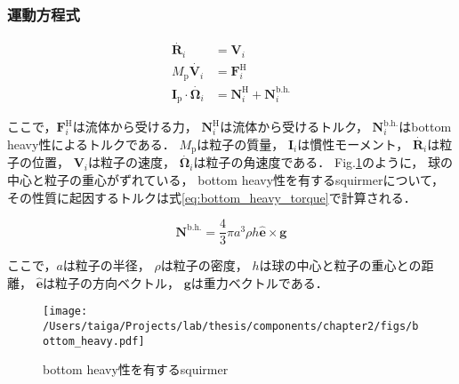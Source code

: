 \subsubsection{運動方程式}
\label{sec:equation_of_motion}
    \begin{align}
        \dot{\boldsymbol{R}_i} &= \boldsymbol{V}_i \\
        M_\mathrm{p} \dot{\boldsymbol{V}_i} &= \boldsymbol{F}^\mathrm{H}_i \\
        \boldsymbol{I}_\mathrm{p} \cdot \dot{\boldsymbol{\Omega}_i} &=
            \boldsymbol{N}^\mathrm{H}_i + \boldsymbol{N}^\mathrm{b.h.}_i
    \end{align}

\noindent
ここで，$\boldsymbol{F}^\mathrm{H}_i$は流体から受ける力，
$\boldsymbol{N}^\mathrm{H}_i$は流体から受けるトルク，
$\boldsymbol{N}^\mathrm{b.h.}_i$はbottom heavy性によるトルクである．
$M_\mathrm{p}$は粒子の質量，
$\boldsymbol{I}_i$は慣性モーメント，
$\dot{\boldsymbol{R}_i}$は粒子の位置，
$\boldsymbol{V}_i$は粒子の速度，
$\dot{\boldsymbol{\Omega}_i}$は粒子の角速度である．
Fig.\ref{fig:bottom_heaviness}のように，
球の中心と粒子の重心がずれている，
bottom heavy性を有するsquirmerについて，
その性質に起因するトルクは式\eqref{eq:bottom_heavy_torque}で計算される\cite{dilute_squirmer}．

    \begin{equation}
        \boldsymbol{N}^\mathrm{b.h.} = \frac{4}{3} \pi a^3 \rho h \boldsymbol{\hat{e}} \times \boldsymbol{g}
        \label{eq:bottom_heavy_torque}
    \end{equation}

\noindent
ここで，$a$は粒子の半径，
$\rho$は粒子の密度，
$h$は球の中心と粒子の重心との距離，
$\boldsymbol{\hat{e}}$は粒子の方向ベクトル，
$\boldsymbol{g}$は重力ベクトルである．

    \begin{figure}[htbp]
        \centering
        \texttt{[image: /Users/taiga/Projects/lab/thesis/components/chapter2/figs/bottom\_heavy.pdf]}
        \caption{bottom heavy性を有するsquirmer}
        \label{fig:bottom_heaviness}
    \end{figure}
